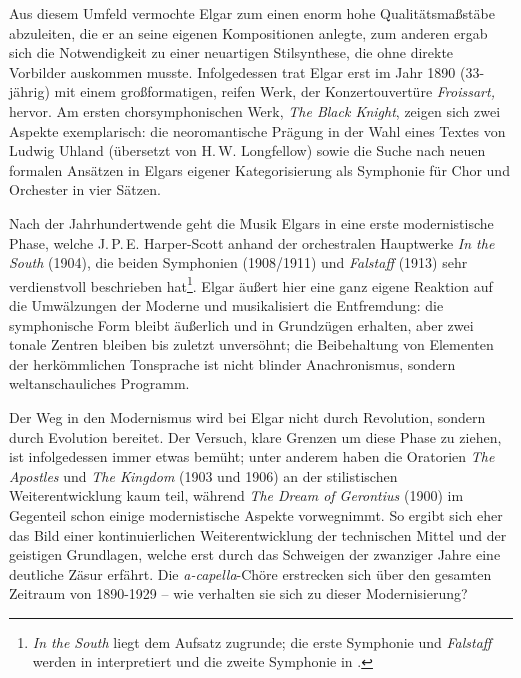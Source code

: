 \documentclass[a4paper,11pt,open=any]{scrbook}
\begin{document}
Aus diesem Umfeld vermochte Elgar zum einen enorm hohe Qualitätsmaßstäbe
abzuleiten, die er an seine eigenen Kompositionen anlegte, zum anderen ergab
sich die Notwendigkeit zu einer neuartigen Stilsynthese, die ohne direkte
Vorbilder auskommen musste.  Infolgedessen trat Elgar erst im Jahr 1890
(33-jährig) mit einem großformatigen, reifen Werk, der Konzertouvertüre
\textit{Frois\-sart,} hervor.  Am ersten chorsymphonischen Werk, \textit{The
Black Knight}, zeigen sich zwei Aspekte exemplarisch: die neoromantische
Prägung in der Wahl eines Textes von Ludwig Uhland (übersetzt von H.\,W.
Longfellow) sowie die Suche nach neuen formalen Ansätzen in Elgars eigener
Kategorisierung als Symphonie für Chor und Orchester in vier Sätzen.

Nach der Jahrhundertwende geht die Musik Elgars in eine erste modernistische Phase,
welche J.\,P.\,E. Harper-Scott anhand der orchestralen Hauptwerke \textit{In the
South} (1904), die beiden Symphonien (1908/1911) und \textit{Falstaff}
(1913) sehr verdienstvoll beschrieben hat\footnote{\textit{In the South} liegt dem Aufsatz
\cite{harperscott2013} zugrunde; die erste Symphonie und \textit{Falstaff}
werden in \cite{harperscott2006} interpretiert und die zweite Symphonie in
\cite{harperscott2007}.}.  Elgar äußert hier eine ganz eigene Reaktion auf die
Umwälzungen der Moderne und musikalisiert die Entfremdung: die symphonische Form
bleibt äußerlich und in Grundzügen erhalten, aber zwei tonale Zentren bleiben bis
zuletzt unversöhnt; die Beibehaltung von Elementen der herkömmlichen Tonsprache ist
nicht blinder Anachronismus, sondern weltanschauliches Programm.

Der Weg in den Modernismus wird bei Elgar nicht durch Revolution, sondern
durch Evolution bereitet.  Der Versuch, klare Grenzen um diese Phase zu
ziehen, ist infolgedessen immer etwas bemüht; unter anderem haben die
Oratorien \textit{The Apostles} und \textit{The Kingdom} (1903 und 1906)
an der stilistischen Weiterentwicklung kaum teil, während \textit{The Dream
of Gerontius} (1900) im Gegenteil schon einige modernistische Aspekte
vorwegnimmt\cite[S.~14f.]{harperscott2006}.  So ergibt sich eher das Bild
einer kontinuierlichen Weiterentwicklung der technischen Mittel und der
geistigen Grundlagen, welche erst durch das Schweigen der zwanziger Jahre
eine deutliche Zäsur erfährt.  Die \textit{a-capella}-Chöre erstrecken sich
über den gesamten Zeitraum von 1890-1929 – wie verhalten sie sich zu dieser
Modernisierung?
\end{document}
